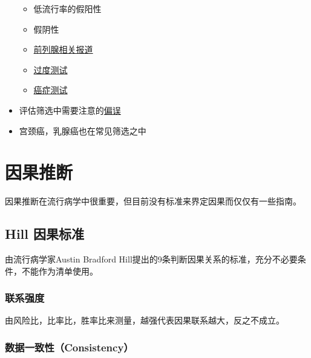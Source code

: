 \documentclass[]{book}
\providecommand{\tightlist}{%
  \setlength{\itemsep}{0pt}\setlength{\parskip}{0pt}}
\begin{document}
\begin{itemize}
  \begin{itemize}
  \tightlist
  \item
    低流行率的假阳性
  \item
    假阴性
  \item
    \href{http://well.blogs.nytimes.com/2012/04/24/older-men-still-being-screened-for-prostate-cancer}{前列腺相关报道}
  \item
    \href{http://www.vaoutcomes.org/papers/Welch_NYTimes_1.pdf}{过度测试}
  \item
    \href{http://well.blogs.nytimes.com/2013/07/29/report-suggests-sweeping-changes-to-cancer-detection-and-treatment}{癌症测试}
  \end{itemize}
\item
  评估筛选中需要注意的\href{http://www.vaoutcomes.org/downloads/Lead_Time_Bias.pdf}{偏误}
\item
  宫颈癌，乳腺癌也在常见筛选之中
\end{itemize}

\hypertarget{ux56e0ux679cux63a8ux65ad}{%
\section{因果推断}\label{ux56e0ux679cux63a8ux65ad}}

因果推断在流行病学中很重要，但目前没有标准来界定因果而仅仅有一些指南。

\hypertarget{hill-ux56e0ux679cux6807ux51c6}{%
\subsection{Hill 因果标准}\label{hill-ux56e0ux679cux6807ux51c6}}

由流行病学家Austin Bradford Hill提出的9条判断因果关系的标准，充分不必要条件，不能作为清单使用。

\hypertarget{ux8054ux7cfbux5f3aux5ea6}{%
\subsubsection{联系强度}\label{ux8054ux7cfbux5f3aux5ea6}}

由风险比，比率比，胜率比来测量，越强代表因果联系越大，反之不成立。

\hypertarget{ux6570ux636eux4e00ux81f4ux6027consistency}{%
\subsubsection{数据一致性（Consistency）}\label{ux6570ux636eux4e00ux81f4ux6027consistency}}
\end{document}
